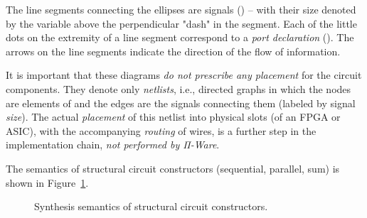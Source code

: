             The line segments connecting the ellipses are signals () – with their size
            denoted by the variable above the perpendicular "dash" in the segment.
            Each of the little dots on the extremity of a line segment correspond to a \emph{port declaration}
            (). The arrows on the line segments indicate the direction of the flow of information.

            It is important that these diagrams \emph{do not prescribe any placement} for the circuit components.
            They denote only \emph{netlists}, i.e., directed graphs in which the nodes are elements of 
            and the edges are the signals connecting them (labeled by signal \emph{size}).
            The actual \emph{placement} of this netlist into physical slots (of an \ac{FPGA} or \ac{ASIC}),
            with the accompanying \emph{routing} of wires, is a further step in the implementation chain,
            \emph{not performed by Π-Ware}.

            The semantics of structural circuit constructors (sequential, parallel, sum) is
            shown in Figure~\ref{fig:semantics-syn-structural}.

            \begin{figure}[h]
                \caption{Synthesis semantics of structural circuit constructors.\label{fig:semantics-syn-structural}}
            \end{figure}

